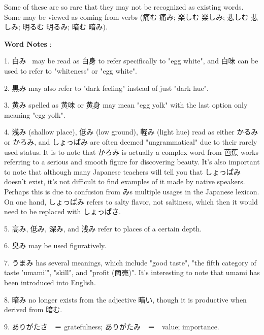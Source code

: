 \par{ Some of these are so rare that they may not be recognized as existing words. Some may be viewed as coming from verbs (痛む \textrightarrow  痛み; 楽しむ \textrightarrow  楽しみ; 悲しむ \textrightarrow  悲しみ; 明るむ \textrightarrow  明るみ; 暗む \textrightarrow  暗み). }

\par{\textbf{Word Notes }: }

\par{1. 白み  may be read as 白身 to refer specifically to "egg white", and 白味 can be used to refer to "whiteness" or "egg white". }

\par{2. 黒み may also refer to "dark feeling" instead of just "dark hue". }

\par{3. 黄み spelled as 黄味 or 黄身 may mean "egg yolk" with the last option only meaning "egg yolk".   }

\par{4. 浅み (shallow place), 低み (low ground), 軽み (light hue) read as either かるみ or かろみ, and しょっぱみ are often deemed "ungrammatical" due to their rarely used status. It is to note that かろみ is actually a complex word from 芭蕉 works referring to a serious and smooth figure for discovering beauty. It's also important to note that although many Japanese teachers will tell you that しょっぱみ doesn't exist, it's not difficult to find examples of it made by native speakers. Perhaps this is due to confusion from み\textquotesingle s multiple usages in the Japanese lexicon. On one hand, しょっぱみ refers to salty flavor, not saltiness, which then it would need to be replaced with しょっぱさ. }

\par{5. 高み, 低み, 深み, and 浅み refer to places of a certain depth. }

\par{6. 臭み may be used figuratively. }

\par{7. うまみ has several meanings, which include "good taste", "the fifth category of taste 'umami'", "skill", and "profit (商売)". It's interesting to note that umami has been introduced into English. }

\par{8. 暗み no longer exists from the adjective 暗い, though it is productive when derived from 暗む. }

\par{9. ありがたさ　＝ gratefulness; ありがたみ　＝　value; importance. }

